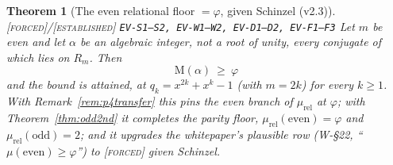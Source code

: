\documentclass[11pt]{article}
\newcommand{\tagF}{\textcolor{cF}{\textsc{[forced]}}}
\newcommand{\tagE}{\textcolor{cE}{\textsc{[established]}}}
\newcommand{\hx}[1]{\textcolor{cC}{\footnotesize\texttt{#1}}}
\newcommand{\gp}{\varphi}
\newcommand{\M}{\mathrm{M}}
\theoremstyle{plain}
\newtheorem{theorem}{Theorem}[section]
\theoremstyle{definition}
\theoremstyle{remark}
\begin{document}
\begin{theorem}[The even relational floor {$=\gp$}, given Schinzel (v2.3)]\label{thm:evenfloor}\tagF{}/\tagE{} \hx{EV-S1--S2, EV-W1--W2, EV-D1--D2, EV-F1--F3}
Let $m$ be \emph{even} and let $\alpha$ be an algebraic integer, not a root of
unity, every conjugate of which lies on $R_m$. Then
\[
\boxed{\ \M(\alpha)\ \ge\ \gp\ }
\]
and the bound is attained, at $q_k=x^{2k}+x^k-1$ (with $m=2k$) for every $k\ge1$.
With Remark~\ref{rem:p4transfer} this pins the even branch of $\mu_{\mathrm{rel}}$
at $\gp$; with Theorem~\ref{thm:odd2nd} it completes the parity floor,
$\mu_{\mathrm{rel}}(\text{even})=\gp$ and $\mu_{\mathrm{rel}}(\text{odd})=2$; and
it upgrades the whitepaper's plausible row (W-\S22, ``$\mu(\text{even})\ge\gp$'')
to \tagF{} given Schinzel.
\end{theorem}
\end{document}
